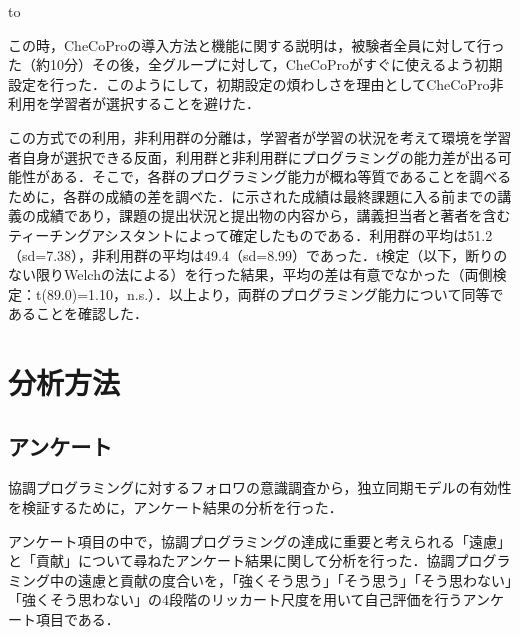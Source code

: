 \begin{table}[tb] 
\caption{グループの内訳と成績} 
\label{tab:record}
\hbox to
\end{table}



この時，CheCoProの導入方法と機能に関する説明は，被験者全員に対して行った（約10分）その後，全グループに対して，CheCoProがすぐに使えるよう初期設定を行った．このようにして，初期設定の煩わしさを理由としてCheCoPro非利用を学習者が選択することを避けた．

この方式での利用，非利用群の分離は，学習者が学習の状況を考えて環境を学習者自身が選択できる反面，利用群と非利用群にプログラミングの能力差が出る可能性がある．そこで，各群のプログラミング能力が概ね等質であることを調べるために，各群の成績の差を調べた．に示された成績は最終課題に入る前までの講義の成績であり，課題の提出状況と提出物の内容から，講義担当者と著者を含むティーチングアシスタントによって確定したものである．利用群の平均は51.2（sd=7.38），非利用群の平均は49.4（sd=8.99）であった．t検定（以下，断りのない限りWelchの法による）を行った結果，平均の差は有意でなかった（両側検定：t(89.0)=1.10，n.s.）．以上より，両群のプログラミング能力について同等であることを確認した．

\section{分析方法}

\subsection{アンケート}

協調プログラミングに対するフォロワの意識調査から，独立同期モデルの有効性を検証するために，アンケート結果の分析を行った．

アンケート項目の中で，協調プログラミングの達成に重要と考えられる「遠慮」と「貢献」について尋ねたアンケート結果に関して分析を行った．協調プログラミング中の遠慮と貢献の度合いを，「強くそう思う」「そう思う」「そう思わない」「強くそう思わない」の4段階のリッカート尺度を用いて自己評価を行うアンケート項目である．

